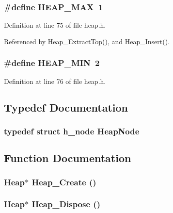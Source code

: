 \subsubsection{\setlength{\rightskip}{0pt plus 5cm}\#define HEAP\_\-MAX~1}\label{heap_8h_da457f4c48bfcb0d63e174e3bb796815}




Definition at line 75 of file heap.h.

Referenced by Heap\_\-Extract\-Top(), and Heap\_\-Insert().
\subsubsection{\setlength{\rightskip}{0pt plus 5cm}\#define HEAP\_\-MIN~2}\label{heap_8h_b0c1b906f7c74d490c2fa755fff02f35}




Definition at line 76 of file heap.h.

\subsection{Typedef Documentation}
\subsubsection{\setlength{\rightskip}{0pt plus 5cm}typedef struct \bf{h\_\-node}
 \bf{Heap\-Node}}\label{heap_8h_cc89c2111211e57d0fcccc05d509d934}




\subsection{Function Documentation}
\subsubsection{\setlength{\rightskip}{0pt plus 5cm}\bf{Heap}$\ast$ Heap\_\-Create ()}\label{heap_8h_75196cac6c0ed2962d81d932f845963c}


\subsubsection{\setlength{\rightskip}{0pt plus 5cm}\bf{Heap}$\ast$ Heap\_\-Dispose ()}\label{heap_8h_b37549e13c0f3cddf58a3d4eaa32301a}


